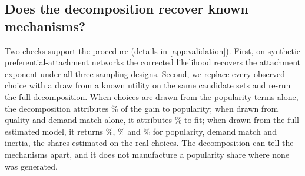 \subsection{Does the decomposition recover known mechanisms?}
\label{sec:validation}
Two checks support the procedure (details in \cref{app:validation}). First, on synthetic preferential-attachment
networks the corrected likelihood recovers the attachment exponent under all three sampling designs. Second, we
replace every observed choice with a draw from a known utility on the same candidate sets and re-run the full
decomposition. When choices are drawn from the popularity terms alone, the decomposition attributes
\recSfPop\% of the gain to popularity; when drawn from quality and demand match alone, it attributes \recQfFit\% to
fit; when drawn from the full estimated model, it returns \recFullPop\%, \recFullMatch\% and \recFullInertia\% for
popularity, demand match and inertia, the shares estimated on the real choices. The decomposition can tell the
mechanisms apart, and it does not manufacture a popularity share where none was generated.
